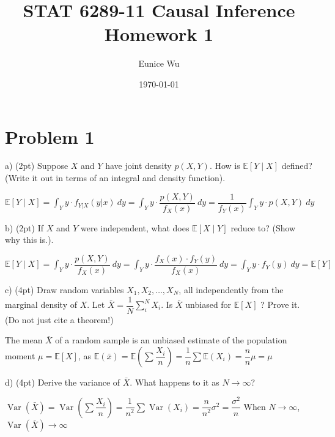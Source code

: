 \documentclass{article}\usepackage[]{graphicx}\usepackage[]{color}
\title{STAT 6289-11 Causal Inference \\ Homework 1}
\author{Eunice Wu}
\date{\today}
\begin{document}
\raggedright
\maketitle






\section*{Problem 1} 
a) (2pt) Suppose $X$ and $Y$ have joint density $p(X, Y)$. How is $\mathbb{E}[Y \mid X]$ defined? (Write it out in terms of an integral and density function).  


\vspace*{0.5cm}
$\mathbb{E}[Y \mid X] = \int_Y y\cdot f_{Y|X}(y|x) \ dy = \int_Y y\cdot \dfrac{p(X, Y)}{f_X(x)} \ dy = \dfrac{1}{f_Y(x)}\int_Y y\cdot p(X, Y) \ dy$   
\vspace*{0.5cm}


b) (2pt) If $X$ and $Y$ were independent, what does $\mathbb{E}[X \mid Y]$ reduce to? (Show why this is.). 


\vspace*{0.5cm}
$\mathbb{E}[Y \mid X] = \int_Y y\cdot \dfrac{p(X, Y)}{f_X(x)} \ dy 
=  \int_Y y\cdot \dfrac{f_X(x) \cdot f_Y(y)}{f_X(x)} \ dy  
=  \int_Y y\cdot f_Y(y) \ dy  = \mathbb{E}[Y] $   
\vspace*{0.5cm}


c) (4pt) Draw random variables $X_{1}, X_{2}, \ldots, X_{N}$, all independently from the marginal density of $X$. Let $\bar{X}=\dfrac{1}{N} \sum_{i}^{N} X_{i}$. Is $\bar{X}$ unbiased for $\mathbb{E}[X]$ ? Prove it. (Do not just cite a theorem!)   


\vspace*{0.5cm}
The mean  $\bar{X}$ of a random sample is an unbiased estimate of the population moment $\mu = \mathbb{E}[X]$,
as $
\mathbb{E}(\bar{x})=\mathbb{E}\left(\sum \dfrac{X_{i}}{n}\right)=\dfrac{1}{n} \sum \mathbb{E}\left(X_{i}\right)=\dfrac{n}{n} \mu=\mu $   
\vspace{0.5cm}


d) (4pt) Derive the variance of $\bar{X}$. What happens to it as $N \rightarrow \infty$? 


\vspace{0.5cm}
$
\operatorname{Var}(\bar{X})=\operatorname{Var}\left(\sum \dfrac{X_{i}}{n}\right)=\dfrac{1}{n^{2}} \sum \operatorname{Var}\left(X_{i}\right)=\dfrac{n}{n^{2}} \sigma^{2}=\dfrac{\sigma^{2}}{n}
$  
When $N \rightarrow \infty$, $\operatorname{Var}(\bar{X}) \rightarrow \infty$   
\vspace*{0.5cm}
\end{document}
